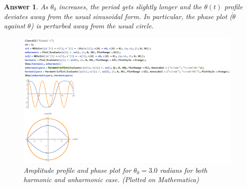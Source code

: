 \documentclass[a4paper]{article}
\newtheorem{ans}{Answer}[section]
\theoremstyle{new}
\begin{document}
\begin{ans}
As $\theta_0$ increases, the period gets slightly longer and the $\theta(t)$ profile deviates away from the usual sinusoidal form. In particular, the phase plot ($\dot{\theta}$ against $\theta$) is perturbed away from the usual circle.
\begin{figure}[H]
    \centering
    \includegraphics[width=\linewidth]{2_7.png}
    \caption{Amplitude profile and phase plot for $\theta_0=3.0$ radians for both harmonic and anharmonic case. (Plotted on Mathematica)}
\end{figure}
\end{ans}
\newpage
\end{document}
